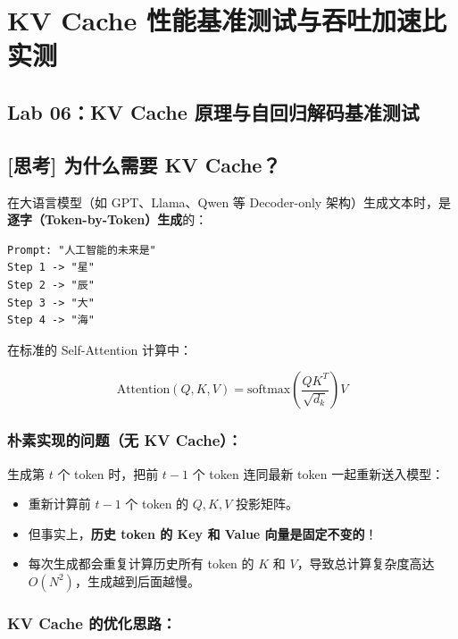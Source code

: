 \chapter{KV Cache 性能基准测试与吞吐加速比实测}

\section{Lab 06：KV Cache 原理与自回归解码基准测试}

\section{[思考] 为什么需要 KV Cache？}

在大语言模型（如 GPT、Llama、Qwen 等 Decoder-only 架构）生成文本时，是\textbf{逐字（Token-by-Token）生成}的：

\begin{lstlisting}[numbers=none]
Prompt: "人工智能的未来是"
Step 1 -> "星"
Step 2 -> "辰"
Step 3 -> "大"
Step 4 -> "海"
\end{lstlisting}

在标准的 Self-Attention 计算中：

\[
\text{Attention}(Q, K, V) = \text{softmax}\left(\frac{Q K^T}{\sqrt{d_k}}\right) V
\]

\subsection{朴素实现的问题（无 KV Cache）：}

生成第 $t$ 个 token 时，把前 $t-1$ 个 token 连同最新 token 一起重新送入模型：
\begin{itemize}
  \item 重新计算前 $t-1$ 个 token 的 $Q, K, V$ 投影矩阵。
  \item 但事实上，\textbf{历史 token 的 Key 和 Value 向量是固定不变的}！
  \item 每次生成都会重复计算历史所有 token 的 $K$ 和 $V$，导致总计算复杂度高达 $O(N^2)$，生成越到后面越慢。
\end{itemize}

\subsection{KV Cache 的优化思路：}

